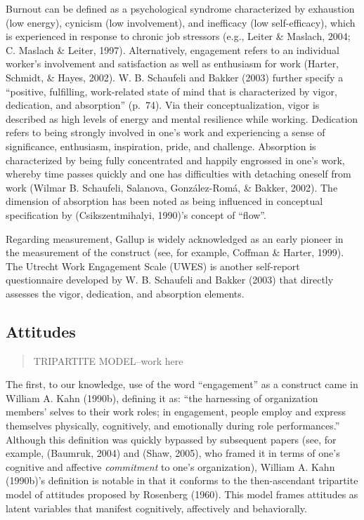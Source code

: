 \documentclass[
  man]{apa6}
\begin{document}
Burnout can be defined as a psychological syndrome characterized by exhaustion (low energy), cynicism (low involvement), and inefficacy (low self-efficacy), which is experienced in response to chronic job stressors (e.g., Leiter \& Maslach, 2004; C. Maslach \& Leiter, 1997). Alternatively, engagement refers to an individual worker's involvement and satisfaction as well as enthusiasm for work (Harter, Schmidt, \& Hayes, 2002). W. B. Schaufeli and Bakker (2003) further specify a ``positive, fulfilling, work-related state of mind that is characterized by vigor, dedication, and absorption'' (p.~74). Via their conceptualization, vigor is described as high levels of energy and mental resilience while working. Dedication refers to being strongly involved in one's work and experiencing a sense of significance, enthusiasm, inspiration, pride, and challenge. Absorption is characterized by being fully concentrated and happily engrossed in one's work, whereby time passes quickly and one has difficulties with detaching oneself from work (Wilmar B. Schaufeli, Salanova, González-Romá, \& Bakker, 2002). The dimension of absorption has been noted as being influenced in conceptual specification by (Csikszentmihalyi, 1990)'s concept of ``flow''.

Regarding measurement, Gallup is widely acknowledged as an early pioneer in the measurement of the construct (see, for example, Coffman \& Harter, 1999). The Utrecht Work Engagement Scale (UWES) is another self-report questionnaire developed by W. B. Schaufeli and Bakker (2003) that directly assesses the vigor, dedication, and absorption elements.

\hypertarget{attitudes}{%
\subsection{Attitudes}\label{attitudes}}

\begin{quote}
TRIPARTITE MODEL--work here
\end{quote}

The first, to our knowledge, use of the word ``engagement'' as a construct came in William A. Kahn (1990b), defining it as: ``the harnessing of organization members' selves to their work roles; in engagement, people employ and express themselves physically, cognitively, and emotionally during role performances.'' Although this definition was quickly bypassed by subsequent papers (see, for example, (Baumruk, 2004) and (Shaw, 2005), who framed it in terms of one's cognitive and affective \emph{commitment} to one's organization), William A. Kahn (1990b)'s definition is notable in that it conforms to the then-ascendant tripartite model of attitudes proposed by Rosenberg (1960). This model frames attitudes as latent variables that manifest cognitively, affectively and behaviorally.
\end{document}

